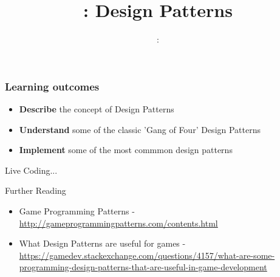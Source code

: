 \usepackage{../../beamerthemeFalmouthGamesAcademy}
\usepackage{multimedia}
\graphicspath{ {../../} }


\usepackage[normalem]{ulem}
\usepackage{wasysym}

\usepackage{pdfpages}

\usetikzlibrary{arrows,automata}




\title{\sessionnumber: Design Patterns}
\subtitle{\modulecode: \moduletitle}

\frame{\titlepage} 

\begin{frame}
\frametitle{Learning outcomes}
\begin{itemize}
	\item \textbf{Describe} the concept of Design Patterns
	\item \textbf{Understand} some of the classic 'Gang of Four' Design Patterns
	\item \textbf{Implement} some of the most commmon design patterns
\end{itemize}
\end{frame}



\begin{frame}
	\begin{center}
		Live Coding...
	\end{center}
\end{frame}

\begin{frame}{Further Reading}
\begin{itemize}
	\item Game Programming Patterns - \url{http://gameprogrammingpatterns.com/contents.html}
	\item What Design Patterns are useful for games - \url{https://gamedev.stackexchange.com/questions/4157/what-are-some-programming-design-patterns-that-are-useful-in-game-development}
\end{itemize}
\end{frame}


